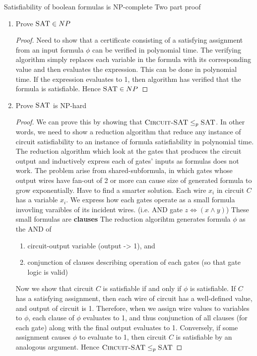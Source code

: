 \documentclass[11pt]{article}
\begin{document}
\begin{theorem*}
    Satisfiability of boolean formulas is NP-complete
    Two part proof 
    \begin{enumerate}
        \item Prove $\textsc{SAT}\in NP$
        \begin{proof}
            Need to show that a certificate consisting of a satisfying assignment from an input formula $\phi$ can be verified in polynomial time. The verifying algorithm simply replaces each variable in the formula with its corresponding value and then evaluates the expression. This can be done in polynomial time. If the expression evaluates to 1, then algorithm has verified that the formula is satisfiable. Hence $\textsc{SAT}\in NP$
        \end{proof}
        \item Prove $\textsc{SAT}$ is NP-hard
        \begin{proof}
            We can prove this by showing that $\textsc{Circuit-SAT} \leq_p \textsc{SAT}$. In other words, we need to show a reduction algorithm that reduce any instance of circuit satisfiability to an instance of formula satisfiability in polynomial time. The reduction algorithm which look at the gates that produces the circuit output and inductively express each of gates' inputs as formulas does not work. The problem arise from shared-subformula, in which gates whose output wires have fan-out of 2 or more can cause size of generated formula to grow exponentially. Have to find a smarter solution. Each wire $x_i$ in circuit $C$ has a variable $x_i$. We express how each gates operate as a small formula invovling varaibles of its incident wires. (i.e. AND gate $z \iff (x \land y)$) These small formulas are \textbf{clauses} The reduction algorihtm generates formula $\phi$ as the AND of
            \begin{enumerate}
                \item circuit-output variable (output -> 1), and 
                \item conjunction of clauses describing operation of each gates (so that gate logic is valid)
            \end{enumerate}
            Now we show that circuit $C$ is satisfiable if and only if $\phi$ is satisfiable. If $C$ has a satisfying assignment, then each wire of circuit has a well-defined value, and output of circuit is 1. Therefore, when we assign wire values to variables to $\phi$, each clause of $\phi$ evaluates to 1, and thus conjunction of all clauses (for each gate) along with the final output evaluates to 1. Conversely, if some assignment causes $\phi$ to evaluate to 1, then circuit $C$ is satisfiable by an analogous argument. Hence $\textsc{Circuit-SAT} \leq_p \textsc{SAT}$
        \end{proof}
    \end{enumerate}
\end{theorem*}
\end{document}
